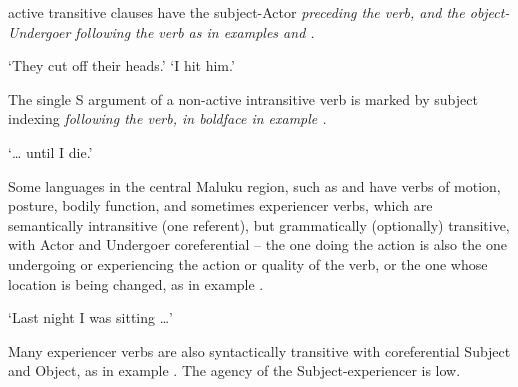  active transitive clauses have the subject-Actor \it{preceding}
the verb, and the object-Undergoer \it{following}
the verb as in examples  and .

\begin{exe}
\setcounter{xnumi}{4}
			\glt	‘They cut off their heads.’
						\label{ex:07-05}
			\glt	‘I hit him.’
						\label{ex:07-06}
\end{exe}

The single S argument of a non-active intransitive verb is marked
by subject indexing \it{following} the verb,
in boldface in example .

\begin{exe}
			\glt	‘{\ldots} until I die.’
						\label{ex:07-07}
\end{exe}

Some languages in the central Maluku region,
such as  \citep{Musgrave2010}
and  have verbs of motion,
posture, bodily function, and sometimes experiencer verbs,
which are semantically intransitive (one referent),
but grammatically (optionally) transitive,
with Actor and Undergoer coreferential -- the one doing the action
is also the one undergoing or experiencing the action or quality
of the verb, or the one whose location is being changed,
as in example .

\begin{exe}
			\glt	‘Last night I was sitting {\ldots}’
						\label{ex:07-08}
\end{exe}

Many experiencer verbs are also syntactically transitive with
coreferential Subject and Object, as in example .
The agency of the Subject-experiencer is low.

